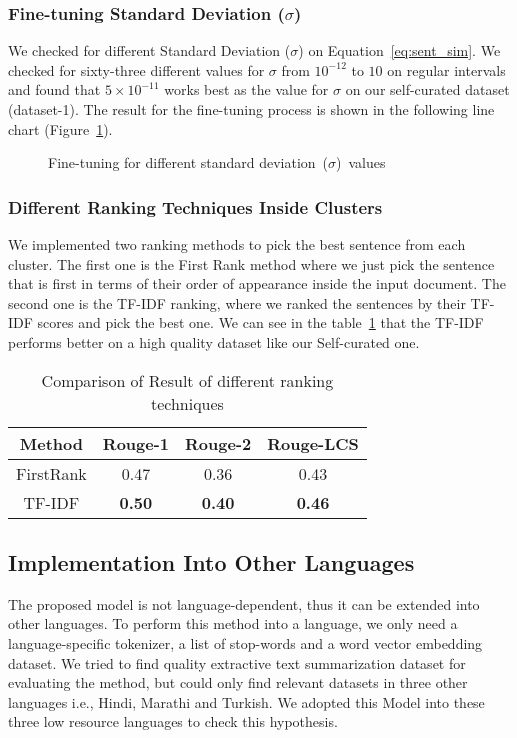 \subsubsection{Fine-tuning Standard Deviation ($\sigma$)}\label{subsubsec:sigma}
We checked for different Standard Deviation ($\sigma$) on Equation~\ref{eq:sent_sim}.
We checked for sixty-three different values for $\sigma$ from $10^{-12}$ to $10$ on regular intervals
and found that $5\times10^{-11}$ works best as the value for $\sigma$ on our self-curated dataset (dataset-1).
The result for the fine-tuning process is shown in the following line chart (Figure~\ref{fig:sigma-fine-tuning}).

\begin{figure}
    \centering
    
    \caption{Fine-tuning for different standard deviation~($\sigma$)~values}
    \label{fig:sigma-fine-tuning}
\end{figure}

\subsubsection{Different Ranking Techniques Inside Clusters}\label{subsubsec:different-ranking-techniques-inside-clusters}
We implemented two ranking methods to pick the best sentence from each cluster.
The first one is the First Rank method where we just pick the sentence that is first in terms of their order of
appearance inside the input document.
The second one is the TF-IDF ranking, where we ranked the sentences by their TF-IDF scores and pick the best one.
We can see in the table~\ref{tab:ranking} that the TF-IDF performs
better on a high quality dataset like our Self-curated one.

\begin{table}[H]
    \centering
    \begin{tabular}{cccc}\hline
        Method      & Rouge-1       & Rouge-2       & Rouge-LCS     \\\hline
        FirstRank   & 0.47          & 0.36          & 0.43          \\
        TF-IDF      & \textbf{0.50} & \textbf{0.40} & \textbf{0.46} \\\hline
    \end{tabular}
    \caption{Comparison of Result of different ranking techniques}
    \label{tab:ranking}
\end{table}

\subsection{Implementation Into Other Languages}\label{subsec:implementation-into-other-languages}
The proposed model is not language-dependent, thus it can be extended into other languages.
To perform this method into a language, we only need a language-specific tokenizer, a list of stop-words and
a word vector embedding dataset.
We tried to find quality extractive text summarization dataset for evaluating the method, but could only
find relevant datasets in three other languages i.e., Hindi, Marathi and Turkish.
We adopted this Model into these three low resource languages to check this hypothesis.\\

